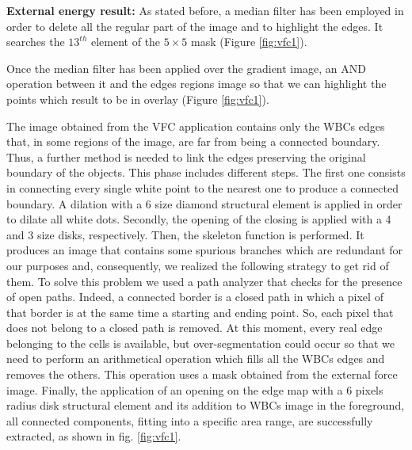 {	\textbf{External energy result:}  As stated before, a median filter has been employed in order to delete all the regular part of the image and to highlight the edges. It searches the $13^{th}$ element of the $5 \times 5$ mask (Figure \ref{fig:vfc1}). 
	
	Once the median filter has been applied over the gradient image, an AND operation between it and the edges regions image so that we can highlight the points which result to be in overlay (Figure \ref{fig:vfc1}).
	
	The image obtained from the VFC application contains only the WBCs edges that, in some regions of the image, are far from being a connected boundary. Thus, a further method is needed to link the edges preserving the original boundary of the objects. This phase includes different steps. The first one consists in connecting every single white point to the nearest one to produce a connected boundary. A dilation with a 6 size diamond structural element is applied in order to dilate all white dots. Secondly, the opening of the closing is applied with a 4 and 3 size disks, respectively. Then, the skeleton function is performed. It produces an image that contains some spurious branches which are redundant for our purposes and, consequently, we realized the following strategy to get rid of them. 
	To solve this problem we used a path analyzer that checks for the presence of open paths. Indeed, a connected border is a closed path in which a pixel of that border is at the same time a starting and ending point. So, each pixel that does not belong to a closed path is removed.
	At this moment, every real edge belonging to the cells is available, but over-segmentation could occur so that we need to perform an arithmetical operation which fills all the WBCs edges and removes the others. This operation uses a mask obtained from the external force image.
	Finally, the application of an opening on the edge map with a 6 pixels radius disk structural element and its addition to WBCs image in the foreground, all connected components, fitting into a specific area range, are successfully extracted, as shown in fig. \ref{fig:vfc1}. 
	
}
